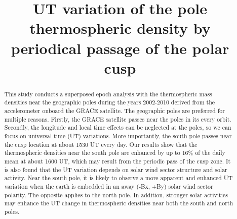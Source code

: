 \documentclass[draft,grl]{/home/gdj/文档/template/agu_template/AGUTeX}
\begin{document}
\title{UT variation of the pole thermospheric density by periodical passage of the polar cusp}


\begin{abstract} 
    This study conducts a superposed epoch analysis with the thermospheric mass densities near the geographic poles 
    during the years 2002-2010 derived from the accelerometer onboard the GRACE satellite.
    The geographic poles are preferred for multiple reasons. 
    Firstly, the GRACE satellite passes near the poles in its every orbit.
    Secondly, the longitude and local time effects can be neglected at the poles, so we can focus on 
    universal time (UT) variations. 
    More importantly, the south pole passes near the cusp location at about 1530 UT every day.
    Our results show that the thermospheric densities near the south pole are enhanced by up to 16\% of
    the daily mean at about 1600 UT, which may result from the periodic pass of the cusp zone.
    It is also found that the UT variation depends on solar wind sector structure and solar activity.
    Near the south pole, it is likely to observe a more apparent and enhanced UT variation when the earth is
    embedded in an away (-Bx, +By) solar wind sector polarity.
    The opposite applies to the north pole.
    In addition, stronger solar activities may enhance the UT change in thermospheric densities near 
    both the south and north poles.
\end{abstract}
\end{document}

